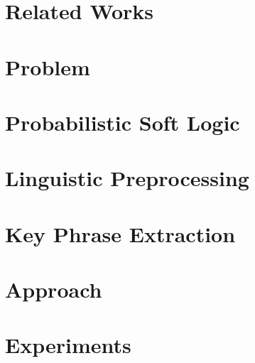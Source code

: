 \documentclass{sig-alternate}
\begin{document}
\section{Related Works}


\section{Problem}


\section{Probabilistic Soft Logic}

\label{section:PSL}


\section{Linguistic Preprocessing}


\section{Key Phrase Extraction}


\section{Approach}


\section{Experiments}



\end{document}
